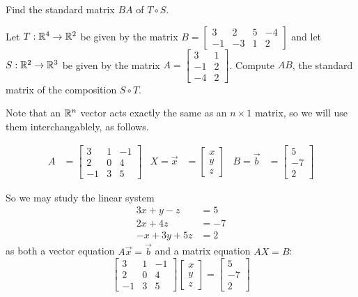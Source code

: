 \begin{applicationActivities}
\begin{activity}{5}
Find the standard matrix \(BA\) of $T \circ S$.
\end{activity}

\begin{activity}{10}
Let \(T: \mathbb{R}^4 \rightarrow \mathbb{R}^2\) be given by the matrix \(B=\begin{bmatrix} 3 & 2 & 5 & -4 \\  -1 & -3  & 1 & 2 \end{bmatrix} \) and let \(S: \mathbb{R}^2 \rightarrow \mathbb{R}^3\) be given by the matrix \(A = \begin{bmatrix} 3 & 1 \\ -1 & 2 \\ -4 & 2 \end{bmatrix}\).  Compute \(AB\), the standard matrix of the composition \(S \circ T\).
\end{activity}

\begin{observation}
Note that an \(\mathbb{R}^n\) vector acts exactly the same as an \(n\times 1\)
matrix, so we will use them interchangablely, as follows.

\begin{align*}
A&=\begin{bmatrix} 3 & 1 & -1 \\ 2 & 0 & 4 \\ -1 & 3 & 5  \end{bmatrix} & X=\vec{x}&=\begin{bmatrix} x  \\ y \\ z  \end{bmatrix} & B=\vec{b} &= \begin{bmatrix} 5 \\ -7 \\ 2 \end{bmatrix}
\end{align*}

So we may study the linear system
\begin{align*}
3x+y-z &= 5 \\ 2x+4z &= -7 \\ -x+3y+5z &=2
\end{align*}
as both a vector equation \(A\vec{x}=\vec{b}\) and a matrix equation
\(AX=B\):
\[
  \begin{bmatrix} 3 & 1 & -1 \\ 2 & 0 & 4 \\ -1 & 3 & 5  \end{bmatrix}
  \begin{bmatrix} x  \\ y \\ z  \end{bmatrix}
    =
  \begin{bmatrix} 5 \\ -7 \\ 2 \end{bmatrix}
\]
\end{observation}



\end{applicationActivities}

